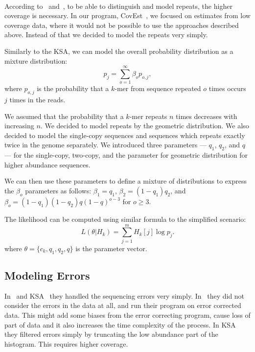 \paragraph{} According to~\cite{waterman} and~\cite{williams}, to be able to distinguish and model repeats, the higher coverage is necessary. In our program, CovEst~\cite{covest}, we focused on estimates from low coverage data, where it would not be possible to use the approaches described above. Instead of that we decided to model the repeats very simply.

Similarly to the KSA, we can model the overall probability distribution as a mixture distribution:
$$p_j = \sum_{o=1}^\infty \beta_o p_{o,j},$$
where $p_{o,j}$ is the probability that a $k$-mer from sequence repeated $o$ times occurs $j$ times in the reads.

We assumed that the probability that a $k$-mer repeats $n$ times decreases with increasing $n$. We decided to model repeats by the geometric distribution. We also decided to model the single-copy sequences and sequences which repeats exactly twice in the genome separately. We introduced three parameters --- $q_1$, $q_2$, and $q$ --- for the single-copy, two-copy, and the parameter for geometric distribution for higher abundance sequences.

We can then use these parameters to define a mixture of distributions to express the $\beta_o$ parameters as follows:
$\beta_1 = q_1$, $\beta_2 = (1-q_1) q_2$, and $\beta_o =
(1-q_1)(1-q_2)q{(1-q)}^{o-3}$ for $o\ge 3$.

The likelihood can be computed using similar formula to the simplified scenario:
$$L(\theta | H_k) = \sum_{j=1}^m H_k[j] \log p_j.$$
where $\theta = \{c_k, q_1, q_2, q\}$ is the parameter vector.

\subsection{Modeling Errors}
\label{sect:modeling-errors}

In~\cite{waterman} and KSA~\cite{williams} they handled the sequencing errors very simply. In~\cite{waterman} they did not consider the errors in the data at all, and run their program on error corrected data. This might add some biases from the error correcting program, cause loss of part of data and it also increases the time complexity of the process. In KSA they filtered errors simply by truncating the low abundance part of the histogram. This requires higher coverage.

